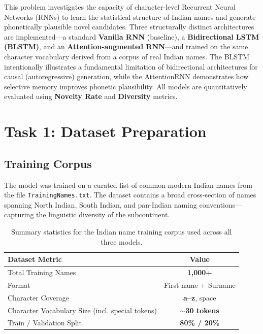\documentclass[11pt,a4paper]{article}
\begin{document}
\begin{infoBox}
This problem investigates the capacity of character-level Recurrent Neural Networks (RNNs) to learn the statistical structure of Indian names and generate phonetically plausible novel candidates. Three structurally distinct architectures are implemented—a standard \textbf{Vanilla RNN} (baseline), a \textbf{Bidirectional LSTM (BLSTM)}, and an \textbf{Attention-augmented RNN}—and trained on the same character vocabulary derived from a corpus of real Indian names. The BLSTM intentionally illustrates a fundamental limitation of bidirectional architectures for causal (autoregressive) generation, while the AttentionRNN demonstrates how selective memory improves phonetic plausibility. All models are quantitatively evaluated using \textbf{Novelty Rate} and \textbf{Diversity} metrics.
\end{infoBox}

\vspace{1em}

\section{Task 1: Dataset Preparation}

\subsection{Training Corpus}
The model was trained on a curated list of common modern Indian names from the file \texttt{TrainingNames.txt}. The dataset contains a broad cross-section of names spanning North Indian, South Indian, and pan-Indian naming conventions—capturing the linguistic diversity of the subcontinent.

\begin{table}[H]
    \centering
    \renewcommand{\arraystretch}{1.3}
    \begin{tabular}{@{} l c @{}}
        \toprule
        \textbf{\color{iitjblue} Dataset Metric} & \textbf{\color{iitjblue} Value} \\
        \midrule
        Total Training Names & \textbf{1,000+} \\
        Format & First name + Surname \\
        Character Coverage & \textbf{a–z}, space \\
        \rowcolor{highlightbg}
        Character Vocabulary Size (incl. special tokens) & $\sim$\textbf{30 tokens} \\
        Train / Validation Split & \textbf{80\% / 20\%} \\
        \bottomrule
    \end{tabular}
    \vspace{0.5em}
    \caption{Summary statistics for the Indian name training corpus used across all three models.}
\end{table}
\end{document}
